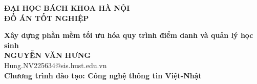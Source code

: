 \documentclass[DoAn.tex]{subfiles}
\begin{document}
\begin{titlepage}
  \thispagestyle{empty}
  \begin{center}

    {\textbf{\large{ĐẠI HỌC BÁCH KHOA HÀ NỘI}}}\\[4cm]

    {\textbf{\huge{ ĐỒ ÁN TỐT NGHIỆP}}}\\[1cm]
    {\textbf{\Large{Xây dựng phần mềm tối ưu hóa quy trình điểm danh và quản lý học sinh}}\\[1cm]

      {\textbf{\large{NGUYỄN VĂN HƯNG}}}\\
      {\large{Hung.NV225634@sis.hust.edu.vn}}\\[0.5cm]

      {\textbf{\large{Chương trình đào tạo: Công nghệ thông tin Việt-Nhật
          }}}\\

      \vspace{4cm}
      \begin{table}[H]
        \centering
      \end{table}}
  \end{center}



\end{titlepage}
\end{document}
